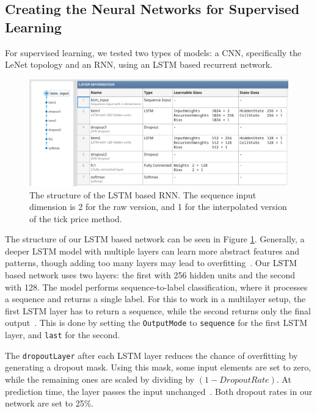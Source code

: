 \documentclass[a4paper,oneside,onecolumn,12pt]{book}
\begin{document}
	\subsection{Creating the Neural Networks for Supervised Learning}
	For supervised learning, we tested two types of models: a CNN, specifically the LeNet topology and an RNN, using an LSTM based recurrent network.

	\begin{figure}[H]
	\begin{center}
		\includegraphics[width=\linewidth]{kep/lstm_structure.png}
		\caption{The structure of the LSTM based RNN. The sequence input dimension is 2 for the raw version, and 1 for the interpolated version of the tick price method.}
		\label{fig:lstm_structure}
	\end{center}
	\end{figure}

	The structure of our LSTM based network can be seen in Figure \ref{fig:lstm_structure}. Generally, a deeper LSTM model with multiple layers can learn more abstract features and patterns, though adding too many layers may lead to overfitting~\cite{DDIELL}. Our LSTM based network uses two layers: the first with 256 hidden units and the second with 128. The model performs sequence-to-label classification, where it processes a sequence and returns a single label. For this to work in a multilayer setup, the first LSTM layer has to return a sequence, while the second returns only the final output~\cite{LSTMNN}. This is done by setting the \texttt{OutputMode} to \texttt{sequence} for the first LSTM layer, and \texttt{last} for the second.

	The \texttt{dropoutLayer} after each LSTM layer reduces the chance of overfitting by generating a dropout mask. Using this mask, some input elements are set to zero, while the remaining ones are scaled by dividing by $(1 - DropoutRate)$. At prediction time, the layer passes the input unchanged~\cite{DL}. Both dropout rates in our network are set to 25\%.
\end{document}
